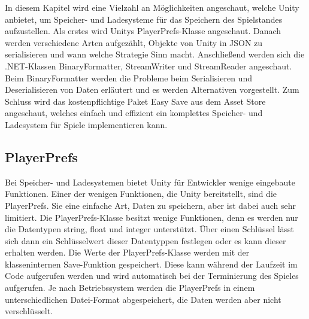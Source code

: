 In diesem Kapitel wird eine Vielzahl an Möglichkeiten angeschaut, welche Unity anbietet, um Speicher- und Ladesysteme für das Speichern des Spielstandes aufzustellen. Als erstes wird Unitys PlayerPrefs-Klasse angeschaut. Danach werden verschiedene Arten aufgezählt, Objekte von Unity in JSON zu serialisieren und wann welche Strategie Sinn macht. Anschließend werden sich die .NET-Klassen BinaryFormatter, StreamWriter und StreamReader angeschaut. Beim BinaryFormatter werden die Probleme beim Serialisieren und Deserialisieren von Daten erläutert und es werden Alternativen vorgestellt. Zum Schluss wird das kostenpflichtige Paket Easy Save aus dem Asset Store angeschaut, welches einfach und effizient ein komplettes Speicher- und Ladesystem für Spiele implementieren kann.

\subsection{PlayerPrefs}
Bei Speicher- und Ladesystemen bietet Unity für Entwickler wenige eingebaute Funktionen. Einer der wenigen Funktionen, die Unity bereitstellt, sind die PlayerPrefs. Sie eine einfache Art, Daten zu speichern, aber ist dabei auch sehr limitiert. Die PlayerPrefs-Klasse besitzt wenige Funktionen, denn es werden nur die Datentypen string, float und integer unterstützt. Über einen Schlüssel lässt sich dann ein Schlüsselwert dieser Datentyppen festlegen oder es kann dieser erhalten werden. Die Werte der PlayerPrefs-Klasse werden mit der klasseninternen Save-Funktion gespeichert. Diese kann während der Laufzeit im Code aufgerufen werden und wird automatisch bei der Terminierung des Spieles aufgerufen.\cite{unityPlayerPrefsSave} Je nach Betriebssystem werden die PlayerPrefs in einem unterschiedlichen Datei-Format abgespeichert, die Daten werden aber nicht verschlüsselt.\cite{unityPlayerPrefs}

